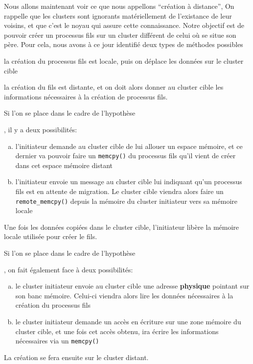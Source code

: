     Nous allons maintenant voir ce que nous appellons ``création à distance'',
    On rappelle que les clusters sont ignorants matériellement de l'existance de
    leur voisins, et que c'est le noyau qui assure cette connaissance. Notre
    objectif est de pouvoir créer un processus fils sur un cluster différent de
    celui où se situe son père. Pour cela, nous avons à ce jour identifié deux
    types de méthodes possibles \benumline \item la création du processus fils
    est locale, puis on déplace les données sur le cluster cible \item la
    création du fils est distante, et on doit alors donner au cluster cible les
    informations nécessaires à la création de processus fils\eenumline.

    Si l'on se place dans le cadre de l'hypothèse \benumline \item \eenumline,
    il y a deux possibilités:
    \begin{enumerate}[a)]
      \item l'initiateur demande au cluster cible de lui allouer un espace
        mémoire, et ce dernier va pouvoir faire un \texttt{memcpy()} du
        processus fils qu'il vient de créer dans cet espace mémoire distant
      \item l'initiateur envoie un message au cluster cible lui indiquant qu'un
        processus fils est en attente de migration. Le cluster cible viendra
        alors faire un \texttt{remote\_memcpy()} depuis la mémoire du cluster
        initiateur vers sa mémoire locale
    \end{enumerate}
    Une fois les données copiées dans le cluster cible, l'initiateur libère
    la mémoire locale utilisée pour créer le fils.

    Si l'on se place dans le cadre de l'hypothèse
    \benumline\setcounter{enumi}{1}\item\eenumline, on fait également face à
    deux possibilités:
    \begin{enumerate}[a)]
      \item le cluster initiateur envoie au cluster cible une adresse
        \textbf{physique} pointant sur son banc mémoire. Celui-ci viendra alors
        lire les données nécessaires à la création du processus fils
      \item le cluster initiateur demande un accès en écriture sur une zone
        mémoire du cluster cible, et une fois cet accès obtenu, ira écrire les
        informations nécessaires via un \texttt{memcpy()}
    \end{enumerate}
    La création se fera ensuite sur le cluster distant.





